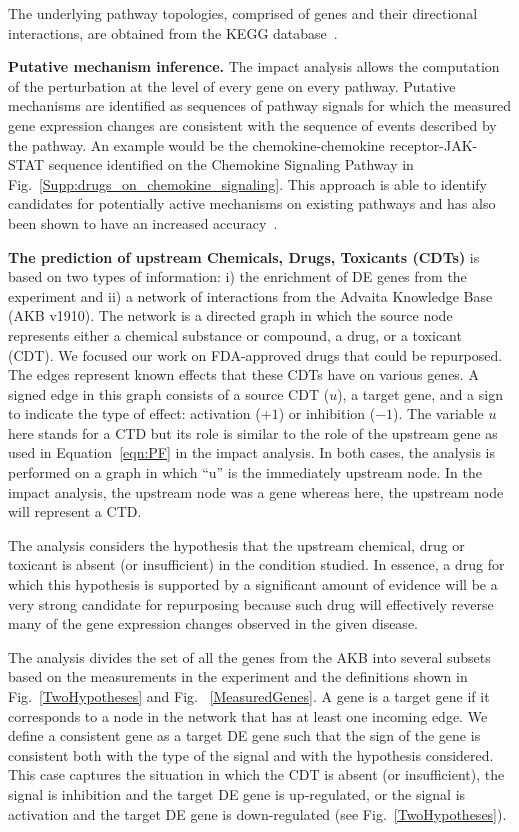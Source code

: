 \documentclass[Minh_PhD_thesis.tex]{subfiles}
\begin{document}
The underlying pathway topologies, comprised of genes and their directional interactions, are obtained from the KEGG database~\cite{ogata1999kegg, kanehisa2010kegg, kanehisa2012kegg,  kanehisa2014data}.


\textbf{Putative mechanism inference.} The impact analysis  allows the computation of the perturbation at the level of every gene on every pathway. Putative mechanisms are identified as sequences of pathway signals for which the measured gene expression changes are consistent with the sequence of events described by the pathway. An example would be the chemokine-chemokine receptor-JAK-STAT sequence identified on the Chemokine Signaling Pathway  in Fig.~\ref{Supp:drugs_on_chemokine_signaling}. This approach is able to identify candidates for potentially active mechanisms on existing pathways and has also been shown to have an increased accuracy~\cite{nguyen2019identifying}. %


\textbf{The prediction of upstream Chemicals, Drugs, Toxicants (CDTs)} is based on two types of information: i) the enrichment of DE genes from the experiment and ii) a network of interactions from the Advaita Knowledge Base (AKB v1910). The network is a directed graph in which the source node represents either a chemical substance or compound, a drug, or a toxicant (CDT). We focused our work on FDA-approved drugs that could be repurposed. The edges represent known effects that these CDTs have on various genes. A signed edge in this graph consists of a source CDT ($u$), a target gene, and a sign to indicate the type of effect: activation ($+1$) or inhibition ($-1$). 
The variable $u$ here stands for a CTD but its role is similar to the role of the upstream gene as used in Equation~\ref{eqn:PF} in the impact analysis. In both cases, the analysis is performed on a graph in which ``u'' is the immediately upstream node. In the impact analysis, the upstream node was  a gene whereas here, the upstream node will represent a CTD.

The analysis considers the hypothesis that  the upstream chemical, drug or toxicant is absent (or insufficient) in the condition studied. In essence, a drug for which this hypothesis is supported by a significant amount of evidence will be a very strong candidate for repurposing because such drug will effectively reverse many of the gene expression changes observed in the given disease. 


The analysis divides the set of all the genes from the AKB into several subsets based on the measurements in the experiment and the definitions shown in Fig.~\ref{TwoHypotheses} and Fig. ~\ref{MeasuredGenes}. 
A gene is a target gene if it corresponds to a node in the network that has at least one incoming edge. We define a consistent gene as a target DE gene such that the sign of the gene is consistent both with the type of the signal and with the hypothesis considered. 
This case captures the situation in which the CDT is absent (or insufficient), the signal is inhibition and the target DE gene is up-regulated, or the signal is activation and the target DE gene is down-regulated (see Fig.~\ref{TwoHypotheses}).
\end{document}
